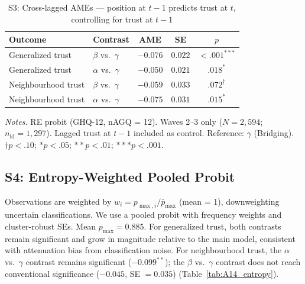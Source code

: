 \documentclass[12pt, a4paper]{article}
\newcommand{\tablenote}[1]{\vspace{4pt}\par\footnotesize\textit{Notes.} #1}
\begin{document}
\begin{table}[H]
\centering
\caption{S3: Cross-lagged AMEs --- position at $t-1$ predicts trust at $t$, controlling for trust at $t-1$}
\label{tab:A13_crosslag}
\small
\begin{tabular}{llccc}
\hline\hline
  Outcome & Contrast & AME & SE & $p$ \\
\hline
  Generalized trust   & $\beta$ vs.\ $\gamma$ & $-0.076$ & $0.022$ & $<.001^{***}$ \\
  Generalized trust   & $\alpha$ vs.\ $\gamma$ & $-0.050$ & $0.021$ & $.018^{*}$ \\
  Neighbourhood trust & $\beta$ vs.\ $\gamma$ & $-0.059$ & $0.033$ & $.072^{\dagger}$ \\
  Neighbourhood trust & $\alpha$ vs.\ $\gamma$ & $-0.075$ & $0.031$ & $.015^{*}$ \\
\hline\hline
\end{tabular}
\tablenote{RE probit (GHQ-12, nAGQ = 12). Waves 2--3 only
($N = 2{,}594$; $n_{\text{id}} = 1{,}297$). Lagged trust at $t-1$ included
as control. Reference: $\gamma$ (Bridging).
$\dagger p<.10$; $* p<.05$; $** p<.01$; $*** p<.001$.}
\end{table}

\subsection{S4: Entropy-Weighted Pooled Probit}
\label{sec:s4}

Observations are weighted by $w_i = p_{\max,i} / \bar{p}_{\max}$ (mean = 1),
downweighting uncertain classifications. We use a pooled probit with frequency
weights and cluster-robust SEs. Mean $p_{\max} = 0.885$. For generalized
trust, both contrasts remain significant and grow in magnitude relative to the
main model, consistent with attenuation bias from classification noise.
For neighbourhood trust, the $\alpha$ vs.\ $\gamma$ contrast remains
significant ($-0.099^{**}$); the $\beta$ vs.\ $\gamma$ contrast does not
reach conventional significance ($-0.045$, SE $= 0.035$)
(Table~\ref{tab:A14_entropy}).
\end{document}
